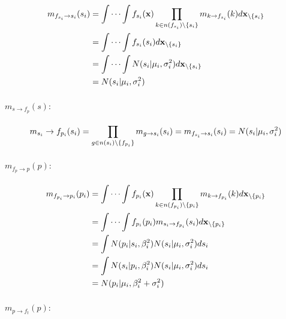 \documentclass[11pt,twoside,spanish]{report} %
\begin{document}
\begin{equation}
	\centering
	\begin{split}
		m_{f_{s_i}\rightarrow s_i}(s_i) & = \int\cdots\int f_{s_i}(\textbf{x})\prod_{k\in n(f_{s_i})\backslash\{s_i\}} m_{k\rightarrow f_{s_i}}(k)d\textbf{x}_{\backslash \{s_i\}} \\
		& = \int\cdots\int f_{s_i}(s_i)d\textbf{x}_{\backslash \{s_i\}} \\
		& = \int\cdots\int N(s_i \vert \mu_i,\sigma_i^2)d\textbf{x}_{\backslash \{s_i\}} \\
		& =  N(s_i \vert \mu_i,\sigma_i^2)
	\end{split}
\end{equation}

\paragraph{$m_{s\rightarrow f_{p}}(s):$}

\begin{equation}
	\centering
	m_{s_i}\rightarrow f_{p_i}(s_i) = \prod_{g\in n(s_i)\backslash\{f_{p_i}\}} m_{g\rightarrow s_i}(s_i)
	= m_{f_{s_i}\rightarrow s_i}(s_i)
	=  N(s_i \vert \mu_i,\sigma_i^2)
\end{equation}

\paragraph{$m_{f_{p}\rightarrow p}(p):$}

\begin{equation}
	\centering
	\begin{split}
		m_{f_{p_i}\rightarrow p_i}(p_i) & = \int\cdots\int f_{p_i}(\textbf{x})\prod_{k\in n(f_{p_i})\backslash\{p_i\}} m_{k\rightarrow f_{p_i}}(k)d\textbf{x}_{\backslash \{p_i\}} \\
		& = \int\cdots\int f_{p_i}(p_i) m_{s_i\rightarrow f_{p_i}}(s_i)d\textbf{x}_{\backslash \{p_i\}} \\
		& = \int N(p_i \vert s_i,\beta_i^2) N(s_i \vert \mu_i,\sigma_i^2)ds_i \\
		& = \int N(s_i \vert p_i,\beta_i^2) N(s_i \vert \mu_i,\sigma_i^2)ds_i \\
		& =  N(p_i \vert \mu_i,\beta_i^2+\sigma_i^2)
	\end{split}
\end{equation}

\paragraph{$m_{p\rightarrow f_{t}}(p):$}
\end{document}

